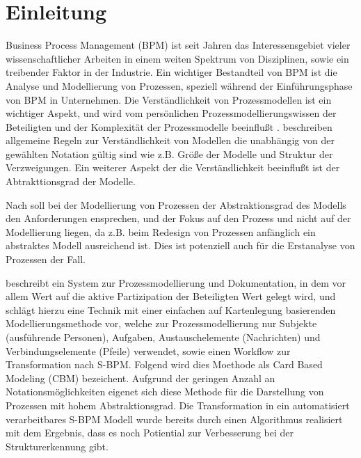 %
%
% 
% 
% 


\chapter{Einleitung}
\label{chap:Einleitung}
Business Process Management (BPM) ist seit Jahren das Interessensgebiet vieler wissenschaftlicher Arbeiten in einem weiten Spektrum von Disziplinen, sowie ein treibender Faktor in der Industrie\cite{vanderAalst2016}. Ein wichtiger Bestandteil von BPM ist die Analyse und Modellierung von Prozessen, speziell während der Einführungsphase von BPM in Unternehmen. Die Verständlichkeit von Prozessmodellen ist ein wichtiger Aspekt, und wird vom persönlichen Prozessmodellierungswissen der Beteiligten und der Komplexität der Prozessmodelle beeinflußt \cite{reijers_study_2011}. \citet{MENDLING2010127} beschreiben allgemeine Regeln zur Verständlichkeit von Modellen die unabhängig von der gewählten Notation gültig sind wie z.B. Größe der Modelle und Struktur der Verzweigungen. Ein weiterer Aspekt der die Verständlichkeit beeinflußt ist der Abtrakttionsgrad der Modelle.

Nach \citet{vanderAalst2016} soll bei der Modellierung von Prozessen der Abstraktionsgrad des Modells den Anforderungen ensprechen, und der Fokus auf den Prozess und nicht auf der Modellierung liegen, da z.B. beim Redesign von Prozessen anfänglich ein abstraktes Modell ausreichend ist. Dies ist potenziell auch für die Erstanalyse von Prozessen der Fall. 

\citet{Oppl:2015:ASB:2723839.2723841} beschreibt ein System zur Prozessmodellierung und Dokumentation, in dem vor allem Wert auf die aktive Partizipation der Beteiligten Wert gelegt wird, und schlägt hierzu eine Technik mit einer einfachen auf Kartenlegung basierenden Modellierungsmethode vor, welche zur Prozessmodellierung nur Subjekte (ausführende Personen), Aufgaben, Austauschelemente (Nachrichten) und Verbindungselemente (Pfeile) verwendet, sowie einen Workflow zur Transformation nach S-BPM. Folgend wird dies Moethode als Card Based Modeling (CBM) bezeichent. Aufgrund der geringen Anzahl an Notationsmöglichkeiten eigenet sich diese Methode für die Darstellung von Prozessen mit hohem Abstraktionsgrad. Die Transformation in ein automatisiert verarbeitbares S-BPM Modell wurde bereits durch einen Algorithmus realisiert mit dem Ergebnis, dass es noch Potiential zur Verbesserung bei der Strukturerkennung gibt\citet{max}. 

